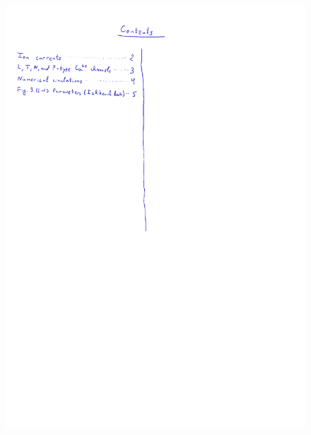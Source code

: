 \documentclass[../workflow.tex]{subfiles}
\begin{document}
    \begin{figure}[H]
        \centering
        \includegraphics[height=0.95\textheight, page=1]{Handwritten Notes/General Notes.pdf}
    \end{figure}
    
    
    
\end{document}
